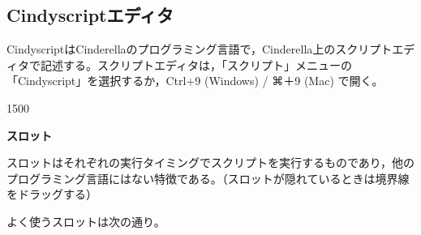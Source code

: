 \documentclass[papersize,a4paper,12pt,uplatex]{jsarticle}
\begin{document}
\subsection{Cindyscriptエディタ}
CindyscriptはCinderellaのプログラミング言語で，Cinderella上のスクリプトエディタで記述する。スクリプトエディタは，「スクリプト」メニューの「Cindyscript」を選択するか，Ctrl+9 (Windows) / ⌘＋9 (Mac) で開く。\\
\vspace{110mm}
\begin{layer}{150}{0}
\end{layer}

\noindent
{\bf  スロット}

スロットはそれぞれの実行タイミングでスクリプトを実行するものであり，他のプログラミング言語にはない特徴である。（スロットが隠れているときは境界線をドラッグする）

よく使うスロットは次の通り。
\end{document}
